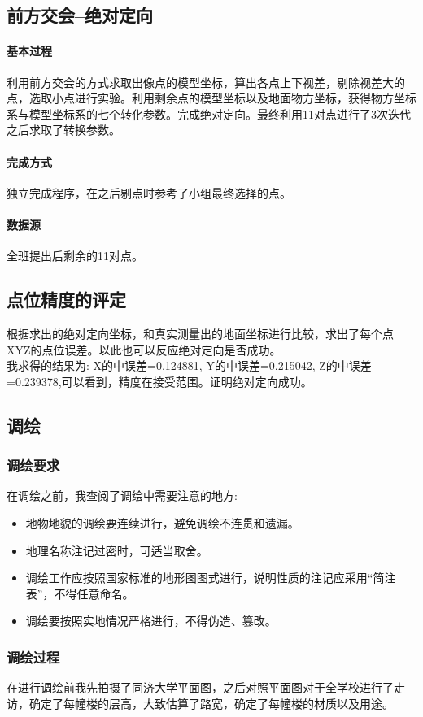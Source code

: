 \subsection{前方交会--绝对定向}
\paragraph{基本过程}
利用前方交会的方式求取出像点的模型坐标，算出各点上下视差，剔除视差大的点，选取小点进行实验。利用剩余点的模型坐标以及地面物方坐标，获得物方坐标系与模型坐标系的七个转化参数。完成绝对定向。最终利用11对点进行了3次迭代之后求取了转换参数。
\paragraph{完成方式} 
独立完成程序，在之后剔点时参考了小组最终选择的点。
\paragraph{数据源}
全班提出后剩余的11对点。

\subsection{点位精度的评定}

根据求出的绝对定向坐标，和真实测量出的地面坐标进行比较，求出了每个点XYZ的点位误差。以此也可以反应绝对定向是否成功。\\
我求得的结果为: X的中误差=0.124881, Y的中误差=0.215042, Z的中误差=0.239378,可以看到，精度在接受范围。证明绝对定向成功。
\subsection{调绘} 
\subsubsection{调绘要求}
在调绘之前，我查阅了调绘中需要注意的地方:

\begin{itemize}
\item 地物地貌的调绘要连续进行，避免调绘不连贯和遗漏。
\item 地理名称注记过密时，可适当取舍。
\item 调绘工作应按照国家标准的地形图图式进行，说明性质的注记应采用“简注表”，不得任意命名。
\item 调绘要按照实地情况严格进行，不得伪造、篡改。
\end{itemize}

\subsubsection{调绘过程}
在进行调绘前我先拍摄了同济大学平面图，之后对照平面图对于全学校进行了走访，确定了每幢楼的层高，大致估算了路宽，确定了每幢楼的材质以及用途。

